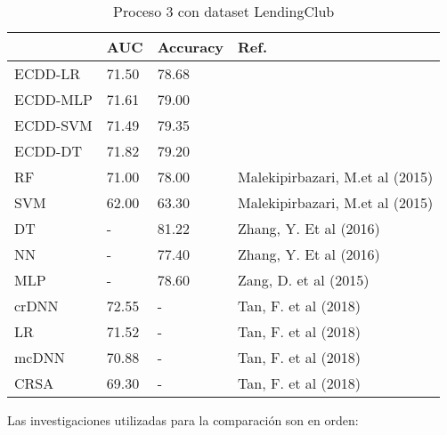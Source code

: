 \begin{table}[]
\centering
\caption{Proceso 3 con dataset LendingClub}
\label{tab:lc-proc3}
\begin{tabularx}{\textwidth}{|l|Y Y l|}
                \hline
                & AUC           & Accuracy      & Ref.                                  \\
                \hline
ECDD-LR           & 71.50         & 78.68         &                                       \\
ECDD-MLP          & 71.61         & 79.00         &                                       \\
ECDD-SVM          & 71.49         & 79.35         &                                       \\
ECDD-DT           & 71.82         & 79.20         &                                       \\
                \hline
RF              & 71.00         & 78.00         & Malekipirbazari, M.et al (2015)       \\
SVM             & 62.00         & 63.30         & Malekipirbazari, M.et al (2015)       \\
DT              & -             & 81.22         & Zhang, Y. Et al (2016)                \\
NN              & -             & 77.40         & Zhang, Y. Et al (2016)                \\
MLP             & -             & 78.60         & Zang, D. et al (2015)                 \\
crDNN           & 72.55         & -             & Tan, F. et al (2018)                  \\
LR              & 71.52         & -             & Tan, F. et al (2018)                  \\
mcDNN           & 70.88         & -             & Tan, F. et al (2018)                  \\
CRSA            & 69.30         & -             & Tan, F. et al (2018)                  \\
                \hline
\end{tabularx}
\par
\small
Las investigaciones utilizadas para la comparación son en orden: \cite{malekipirbazari2015risk, zhang2016research, zang2014credit, tan2018deep}
\end{table}


